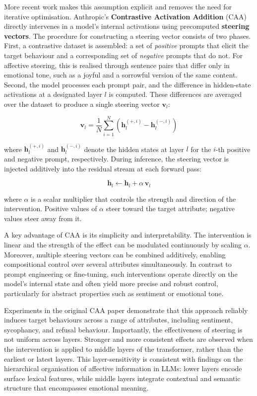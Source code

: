 More recent work makes this assumption explicit and removes the need for iterative optimisation. Anthropic's \textbf{Contrastive Activation Addition} (CAA)~\cite{caa} directly intervenes in a model's internal activations using precomputed \textbf{steering vectors}. The procedure for constructing a steering vector consists of two phases. First, a contrastive dataset is assembled: a set of \textit{positive} prompts that elicit the target behaviour and a corresponding set of \textit{negative} prompts that do not. For affective steering, this is realised through sentence pairs that differ only in emotional tone, such as a joyful and a sorrowful version of the same content. Second, the model processes each prompt pair, and the difference in hidden-state activations at a designated layer $l$ is computed. These differences are averaged over the dataset to produce a single steering vector $\mathbf{v}_l$:

\begin{equation}
    \mathbf{v}_l = \frac{1}{N}\sum_{i=1}^{N}\left(\mathbf{h}_l^{(+,i)} - \mathbf{h}_l^{(-,i)}\right)
\end{equation}

\noindent where $\mathbf{h}_l^{(+,i)}$ and $\mathbf{h}_l^{(-,i)}$ denote the hidden states at layer $l$ for the $i$-th positive and negative prompt, respectively. During inference, the steering vector is injected additively into the residual stream at each forward pass:

\begin{equation}
    \mathbf{h}_l \leftarrow \mathbf{h}_l + \alpha\,\mathbf{v}_l
\end{equation}

\noindent where $\alpha$ is a scalar multiplier that controls the strength and direction of the intervention. Positive values of $\alpha$ steer toward the target attribute; negative values steer away from it.

A key advantage of CAA is its simplicity and interpretability. The intervention is linear and the strength of the effect can be modulated continuously by scaling $\alpha$. Moreover, multiple steering vectors can be combined additively, enabling compositional control over several attributes simultaneously. In contrast to prompt engineering or fine-tuning, such interventions operate directly on the model's internal state and often yield more precise and robust control, particularly for abstract properties such as sentiment or emotional tone.

Experiments in the original CAA paper demonstrate that this approach reliably induces target behaviours across a range of attributes, including sentiment, sycophancy, and refusal behaviour. Importantly, the effectiveness of steering is not uniform across layers. Stronger and more consistent effects are observed when the intervention is applied to middle layers of the transformer, rather than the earliest or latest layers. This layer-sensitivity is consistent with findings on the hierarchical organisation of affective information in LLMs: lower layers encode surface lexical features, while middle layers integrate contextual and semantic structure that encompasses emotional meaning.

